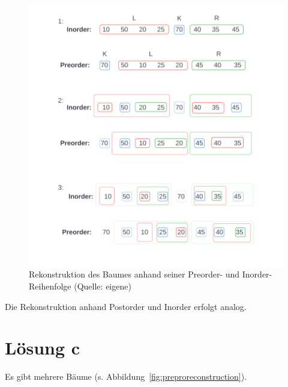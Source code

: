 \begin{figure}
    \begin{center}
        \includegraphics[scale=0.5]{chapters/5. Binäre Bäume/img/reconstruction}
        \caption{Rekonstruktion des Baumes anhand seiner Preorder- und Inorder-Reihenfolge (Quelle: eigene)}
        \label{fig:reconstruction}
    \end{center}
\end{figure}

Die Rekonstruktion anhand Postorder und Inorder erfolgt analog.

\newpage

\section{Lösung c}

Es gibt mehrere Bäume (s. Abbildung~\ref{fig:preproreconstruction}).


